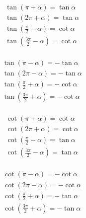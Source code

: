 \documentclass[a4paper, fleqn, fontset = mac]{ctexart}
\begin{document}
	\begin{minipage}{0.2\textwidth}
	\small
	\begin{align*}
		& \tan\left( \pi + \alpha \right) = \tan\alpha \\
		& \tan\left( 2\pi + \alpha \right) = \tan\alpha \\
		& \tan\left( \frac\pi2 - \alpha \right) = \cot\alpha \\
		& \tan\left( \frac{3\pi}2 - \alpha \right) = \cot\alpha \\
	\end{align*}

	\begin{align*}
		& \tan\left( \pi - \alpha \right) = -\tan\alpha \\
		& \tan\left( 2\pi - \alpha \right) = -\tan\alpha \\
		& \tan\left( \frac\pi2 + \alpha \right) = -\cot\alpha \\
		& \tan\left( \frac{3\pi}2 + \alpha \right) = -\cot\alpha \\
	\end{align*}
	\end{minipage}
	\begin{minipage}{0.2\textwidth}
	\small
	\begin{align*}
		& \cot\left( \pi + \alpha \right) = \cot\alpha \\
		& \cot\left( 2\pi + \alpha \right) = \cot\alpha \\
		& \cot\left( \frac\pi2 - \alpha \right) = \tan\alpha \\
		& \cot\left( \frac{3\pi}2 - \alpha \right) = \tan\alpha \\
	\end{align*}

	\begin{align*}
		& \cot\left( \pi - \alpha \right) = -\cot\alpha \\
		& \cot\left( 2\pi - \alpha \right) = -\cot\alpha \\
		& \cot\left( \frac\pi2 + \alpha \right) = -\tan\alpha \\
		& \cot\left( \frac{3\pi}2 + \alpha \right) = -\tan\alpha \\
	\end{align*}
	\end{minipage}

	\pagebreak
		
\end{document}
